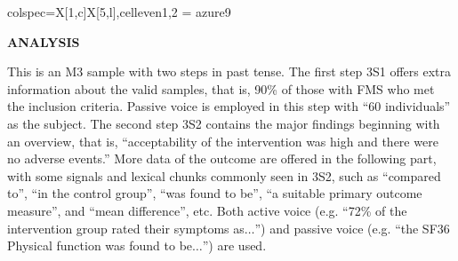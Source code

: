 \documentclass[a4paper]{ctexbook}
\begin{document}
\begin{sample}[label={myautocounter}]{\heiti}
{\begin{tblr}{colspec={X[1,c]X[5,l]},cell{even}{1,2} = {azure9}}
    \bottomrule
  \end{tblr}
  }

  \noindent \textbf{ANALYSIS}

  This is an M3 sample with two steps in past tense. The first step 3S1 offers extra information about the valid samples, that is, 90\% of those with FMS who met the inclusion criteria. Passive voice is employed in this step with ``60 individuals'' as the subject. The second step 3S2 contains the major findings beginning with an overview, that is, ``acceptability of the intervention was high and there were no adverse events.'' More data of the outcome are offered in the following part, with some signals and lexical chunks commonly seen in 3S2, such as ``compared to'', ``in the control group'', ``was found to be'', ``a suitable primary outcome measure'', and ``mean difference'', etc. Both active voice (e.g. ``72\% of the intervention group rated their symptoms as$\dots$'') and passive voice (e.g. ``the SF36 Physical function was found to be$\dots$'') are used.

\end{sample}
\end{document}
